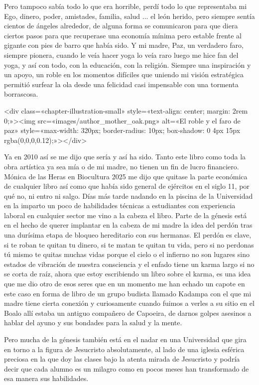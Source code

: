 \documentclass[12pt,twoside,openany]{book}
\begin{document}
Pero tampoco sabía todo lo que era horrible, perdí todo lo que representaba mi Ego, dinero, poder, amistades, familia, salud ... el león herido, pero siempre sentía cientos de ángeles alrededor, de alguna forma se comunicaron para que diera ciertos pasos para que recuperase una economía mínima pero estable frente al gigante con pies de barro que había sido. Y mi madre, Paz, un verdadero faro, siempre pionera, cuando le veía hacer yoga lo veía raro luego me hice fan del yoga, y así con todo, con la educación, con la religión. Siempre una inspiración y un apoyo, un roble en los momentos difíciles que uniendo mi visión estratégica permitió surfear la ola desde una felicidad casi impensable con una tormenta borrascosa. 

<div class=«chapter-illustration-small» style=«text-align: center; margin: 2rem 0;»><img src=«images/author_mother_oak.png» alt=«El roble y el faro de paz» style=«max-width: 320px; border-radius: 10px; box-shadow: 0 4px 15px rgba(0,0,0,0.12);»></div>

Ya en 2010 así se me dijo que sería y así ha sido. Tanto este libro como toda la obra artística ya sea mía o de mi madre, no tienen un fin de lucro financiero. Mónica de las Heras en Biocultura 2025 me dijo que quitase la parte económica de cualquier libro así como que había sido general de ejércitos en el siglo 11, por qué no, ni entro ni salgo. Días más tarde nadando en la piscina de la Universidad en la imparto un poco de habilidades técnicas a estudiantes con experiencia laboral en cualquier sector me vino a la cabeza el libro. Parte de la génesis está en el hecho de querer implantar en la cabeza de mi madre la idea del perdón tras una durísima etapa de bloqueo hereditario con sus hermanas. El perdón es clave, si te roban te quitan tu dinero, si te matan te quitan tu vida, pero si no perdonas tú mismo te quitas muchas vidas porque el cielo o el infierno no son lugares sino estados de vibración de nuestra consciencia y el enfado tiene un karma largo si no se corta de raíz, ahora que estoy escribiendo un libro sobre el karma, es una idea que me dio otro de esos seres que en un momento me han echado un capote en este caso en forma de libro de un grupo budista llamado Kadampa con el que mi madre tiene cierta conexión y curiosamente cuando fuimos a verles a su sitio en el Boalo allí estaba un antiguo compañero de Capoeira, de darnos golpes asesinos a hablar del ayuno y sus bondades para la salud y la mente.

Pero mucha de la génesis también está en el nadar en una Universidad que gira en torno a la figura de Jesucristo absolutamente, al lado de una iglesia esférica preciosa en la que doy las clases bajo la atenta mirada de Jesucristo y podría decir que cada alumno es un milagro como en pocos meses han transformado de esa manera sus habilidades. 
\end{document}
